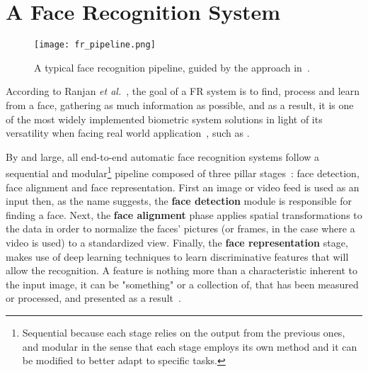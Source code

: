 \documentclass[class=report, crop=false, a4paper, 12pt]{standalone}
\begin{document}
\newpage
\section{A Face Recognition System}

\begin{figure}[!h]
    \texttt{[image: fr\_pipeline.png]}
    \caption[Pipeline]{A typical face recognition pipeline, guided by the approach in~\autocite{wangDeepFaceRecognition2021}.}
    \label{fig:fr pipeline}
\end{figure}

\par According to Ranjan \textit{et al.}~\autocite{ranjanDeepLearningUnderstanding2018}, the goal of a FR system is to find, process and learn from a face, gathering as much information as possible, and as a result, it is one of the most widely implemented biometric system solutions in light of its versatility when facing real world application~\autocite{duElementsEndtoendDeep2022}, such as .

\par By and large, all end-to-end automatic face recognition systems follow a sequential and modular\footnote{Sequential because each stage relies on the output from the previous ones, and modular in the sense that each stage employs its own method and it can be modified to better adapt to specific tasks.} pipeline  composed of three pillar stages~\autocite{wangDeepFaceRecognition2021}: face detection, face alignment and face representation. First an image or video feed is used as an input then, as the name suggests, the \textbf{face detection} module is responsible for finding a face. Next, the \textbf{face alignment} phase applies spatial transformations to the data in order to normalize the faces' pictures (or frames, in the case where a video is used) to a standardized view. Finally, the \textbf{face representation} stage, makes use of deep learning techniques to learn discriminative features that will allow the recognition. A feature is nothing more than a characteristic inherent to the input image, it can be "something" or a collection of, that has been measured or processed, and presented as a result~\autocite{Goodfellow-et-al-2016}.
\end{document}
